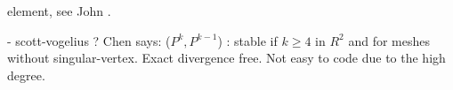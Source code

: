 
\textcite{scvo85} element, see John \cite[p70]{john16}.

- scott-vogelius ? Chen says: ($P^k ,P^{k-1}$) : stable if $k \ge 4$ in $R^2$ and for meshes without
singular-vertex. Exact divergence free. Not easy to code due to the high degree.
